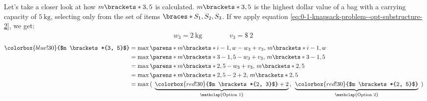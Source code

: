 Let's take a closer look at how \colorbox{blue!30}{$m \brackets*{3, 5}$} is calculated. $m \brackets*{3, 5}$ is the highest dollar value of a bag with a carrying capacity of $\qty{5}{\kilo\gram}$, selecting only from the set of items $\braces*{S_1, S_2, S_3}$. If we apply equation \eqref{eq:0-1-knapsack-problem--opt-substructure-2}, we get:
\medskip
\begin{gather*}
    w_3 = \qty{2}{\kilo\gram}
    \qquad\qquad
    v_3 = \SI{2}[\$]{}
\end{gather*}
\begin{align}
    \colorbox{blue!30}{$m \brackets*{3, 5}$} &= \max\parens*{
        m \brackets*{i - 1, w - w_3} + v_3, \,
        m \brackets*{i - 1, w}
    }
    \notag \\
    &= \max\parens*{
        m \brackets*{3 - 1, 5 - w_3} + v_3, \,
        m \brackets*{3 - 1, 5}
    }
    \notag \\
    &= \max\parens*{
        m \brackets*{2, 5 - w_3} + v_3, \,
        m \brackets*{2, 5}
    }
    \notag \\
    &= \max\parens*{
        m \brackets*{2, 5 - 2} + 2, \,
        m \brackets*{2, 5}
    }
    \notag \\
    &= \max{(
        \phantom{.}
        \underbrace{
            \colorbox{red!30}{$m \brackets*{2, 3}$} + 2
        }_{\mathclap{\text{Option 1}}}
        \,
        ,
        \phantom{.}
        \underbrace{
            \colorbox{red!30}{$m \brackets*{2, 5}$}
        }_{\mathclap{\text{Option 2}}}
        \phantom{.}
    )}
    \label{eq:0-1-knapsack-problem--example1}
\end{align}

